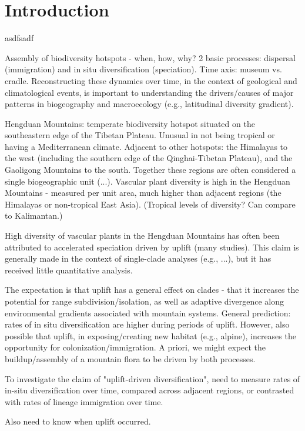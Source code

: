 \section{Introduction}

asdfsadf

Assembly of biodiversity hotspots - when, how, why? 2 basic processes: dispersal (immigration) and in situ diversification (speciation). Time axis: museum vs. cradle. Reconstructing these dynamics over time, in the context of geological and climatological events, is important to understanding the drivers/causes of major patterns in biogeography and macroecology (e.g., latitudinal diversity gradient).\citep{25041629}

Hengduan Mountains: temperate biodiversity hotspot situated on the southeastern edge of the Tibetan Plateau. Unusual in not being tropical or having a Mediterranean climate. Adjacent to other hotspots: the Himalayas to the west (including the southern edge of the Qinghai-Tibetan Plateau), and the Gaoligong Mountains to the south. Together these regions are often considered a single biogeographic unit (...). Vascular plant diversity is high in the Hengduan Mountains - measured per unit area, much higher than adjacent regions (the Himalayas or non-tropical East Asia). (Tropical levels of diversity? Can compare to Kalimantan.)

High diversity of vascular plants in the Hengduan Mountains has often been attributed to accelerated speciation driven by uplift (many studies). This claim is generally made in the context of single-clade analyses (e.g., ...), but it has received little quantitative analysis.

The expectation is that uplift has a general effect on clades - that it increases the potential for range subdivision/isolation, as well as adaptive divergence along environmental gradients associated with mountain systems. General prediction: rates of in situ diversification are higher during periods of uplift. However, also possible that uplift, in exposing/creating new habitat (e.g., alpine), increases the opportunity for colonization/immigration. A priori, we might expect the buildup/assembly of a mountain flora to be driven by both processes.

To investigate the claim of "uplift-driven diversification", need to measure rates of in-situ diversification over time, compared across adjacent regions, or contrasted with rates of lineage immigration over time.

Also need to know when uplift occurred.

